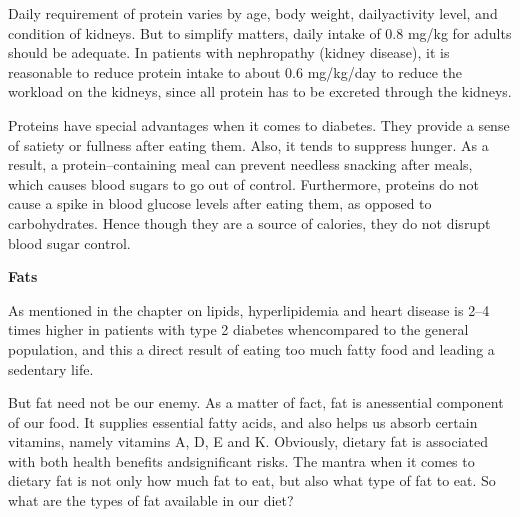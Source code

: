 Daily requirement of protein varies by age, body weight, daily\break activity level, and condition of kidneys. But to simplify matters, daily intake of 0.8 mg/kg for adults should be adequate. In patients with nephropathy (kidney disease), it is reasonable to reduce protein intake to about 0.6 mg/kg/day to reduce the workload on the kidneys, since all protein has to be excreted through the kidneys.

Proteins have special advantages when it comes to diabetes. They provide a sense of satiety or fullness after eating them. Also, it tends to suppress hunger. As a result, a protein–containing meal can prevent needless snacking after meals, which causes blood sugars to go out of control. Furthermore, proteins do not cause a spike in blood glucose levels after eating them, as opposed to carbohydrates. Hence though they are a source of calories, they do not disrupt blood sugar control.

\noindent\textbf{Fats}

As mentioned in the chapter on lipids, hyperlipidemia and heart disease is 2–4 times higher in patients with type 2 diabetes when\break compared to the general population, and this a direct result of eating too much fatty food and leading a sedentary life.

But fat need not be our enemy. As a matter of fact, fat is an\break essential component of our food. It supplies essential fatty acids, and also helps us absorb certain vitamins, namely vitamins A, D, E and K. Obviously, dietary fat is associated with both health benefits and\break significant risks. The mantra when it comes to dietary fat is not only how much fat to eat, but also what type of fat to eat. So what are the types of fat available in our diet?

